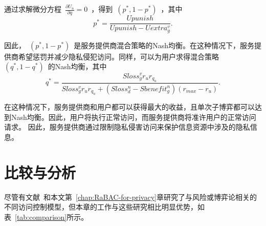 通过求解微分方程~$\frac{\partial U_n}{\partial q}=0$~，得到~$(p^*,1-p^*)$~，其中
\begin{equation}
p^*=\dfrac{Upunish}{Upunish-Uextra_g^v}.
\end{equation}

因此，~$(p^*,1-p^*)$~是服务提供商混合策略的Nash均衡。在这种情况下，服务提供商希望惩罚并减少隐私侵犯访问。同样，可以为用户求得混合策略~$(q^*,1-q^*)$~的Nash均衡，其中
\begin{equation}
q^*=\dfrac{Sloss_g^v r_u r_{q_u}}{Sloss_g^v r_u  r_{q_u} +(Sloss_d^n -Sbenefit_g^n)(r_{max}-r_u)}.
\end{equation}

在这种情况下，服务提供商和用户都可以获得最大的收益，且单次子博弈都可以达到Nash均衡。因此，用户将执行正常访问，而服务提供商将准许用户的正常访问请求。 因此，服务提供商通过限制隐私侵害访问来保护信息资源中涉及的隐私信息。

\section{比较与分析}
\label{sec:comparison}

尽管有文献~\cite{ni2010risk,wang2011quantified,shaikh2012dynamic,santos2016framework,wang2019game,zhang2015towards,zhen2015risk,zhang2018privacy,gao2018game,liu2016dynamic,helil2017non,hu2014game}和本文第~\ref{chap:RaBAC-for-privacy}章研究了与风险或博弈论相关的不同访问控制模型，但本章的工作与这些研究相比明显优势，如表~\ref{tab:comparison}所示。


